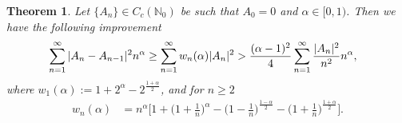\documentclass[12pt]{amsart}
\newtheorem{Theorem}{\sc Theorem}[section]
\theoremstyle{definition}
\theoremstyle{plain}
\theoremstyle{definition}
\numberwithin{equation}{section}
\begin{document}
\begin{Theorem}Let $\{A_n\}\in C_c(\mathbb{N}_0)$ be such that $A_{0}=0$ and $\alpha\in[0, 1)$. Then we have the following improvement
\begin{align}{\label{GUPI01}}
\displaystyle\sum_{n=1}^{\infty}|A_{n}-A_{n-1}|^{2}n^{\alpha} &\geq \displaystyle\sum_{n=1}^{\infty}w_{n}(\alpha)|A_{n}|^{2}>\frac{(\alpha-1)^2}{4}\sum_{n=1}^{\infty}\frac{|A_{n}|^{2}}{n^2}{n}^{\alpha},
\end{align}where  $w_{1}(\alpha):=1+2^{\alpha}-2^{\frac{1+\alpha}{2}}$, and for $ n\geq2$
\begin{align*}
w_{n}(\alpha)& =n^{\alpha}\Big[1+\Big(1+\frac{1}{n}\Big)^{\alpha}-\Big(1-\frac{1}{n}\Big)^{\frac{1-\alpha}{2}}-\Big(1+\frac{1}{n}\Big)^{\frac{1+\alpha}{2}}\Big].
\end{align*}
\end{Theorem}
\end{document}

